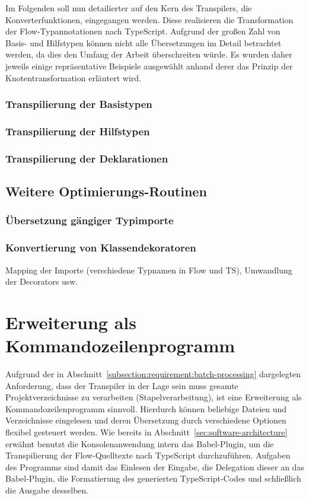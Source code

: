 Im Folgenden soll nun detailierter auf den Kern des Transpilers, die Konverterfunktionen, eingegangen werden. Diese realisieren die Transformation der Flow-Typannotationen nach TypeScript. Aufgrund der großen Zahl von Basis- und Hilfstypen können nicht alle Übersetzungen im Detail betrachtet werden, da dies den Umfang der Arbeit überschreiten würde. Es wurden daher jeweils einige repräsentative Beispiele ausgewählt anhand derer das Prinzip der Knotentransformation erläutert wird.

  \subsubsection{Transpilierung der Basistypen}
  \subsubsection{Transpilierung der Hilfstypen}
  \subsubsection{Transpilierung der Deklarationen}

\subsection{Weitere Optimierungs-Routinen}
  \subsubsection{Übersetzung gängiger Typimporte}
  \subsubsection{Konvertierung von Klassendekoratoren}
  \label{subsec:class-decorators}

Mapping der Importe (verschiedene Typnamen in Flow und TS), Umwandlung der Decorators usw.

\section{Erweiterung als Kommandozeilenprogramm}

Aufgrund der in Abschnitt~\ref{subsection:requirement:batch-processing} dargelegten Anforderung, dass der Transpiler in der Lage sein muss gesamte Projektverzeichnisse zu verarbeiten (Stapelverarbeitung), ist eine Erweiterung als Kommandozeilenprogramm sinnvoll. Hierdurch können beliebige Dateien und Verzeichnisse eingelesen und deren Übersetzung durch verschiedene Optionen flexibel gesteuert werden. Wie bereits in Abschnitt~\ref{sec:software-architecture} erwähnt benutzt die Konsolenanwendung intern das Babel-Plugin, um die Transpilierung der Flow-Quelltexte nach TypeScript durchzuführen. Aufgaben des Programms sind damit das Einlesen der Eingabe, die Delegation dieser an das Babel-Plugin, die Formatierung des generierten TypeScript-Codes und schließlich die Ausgabe desselben.

